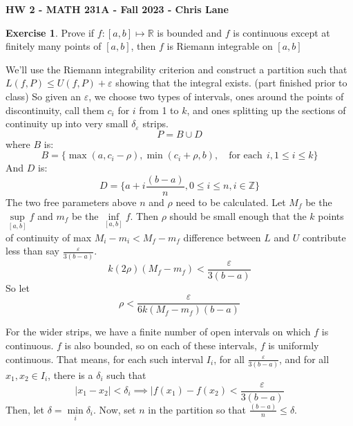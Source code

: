 \documentclass[11pt,oneside]{article}
\numberwithin{equation}{section}
\theoremstyle{definition}
\newtheorem{exercise}{Exercise}
\def\RR{\mathbb{R}}
\def\ZZ{\mathbb{Z}}
\begin{document}
\textbf{HW 2 - MATH 231A - Fall 2023 - Chris Lane}
\begin{exercise}
  Prove if $f:[a, b] \mapsto \RR $ is bounded and $f$ is continuous
  except at finitely many points of $[a,b]$, then $f$ is Riemann integrable on $[a,b ]$
\end{exercise}
\begin{solution}
  We'll use the Riemann integrability criterion and construct a
  partition such that $L(f, P) \leq U(f, P) + \varepsilon$ showing that
  the integral exists.  (part finished prior to class) So given an $\varepsilon$, we
  choose two types of intervals, ones around the points of
  discontinuity, call them $c_i$ for $i$ from 1 to $k$, and ones
  splitting up the sections of continuity up into very
  small $\delta_{\varepsilon}$ strips.
  $$
  P = B \cup D
  $$
  where $B$ is:
  $$
  B = \{ \max(a, c_i - \rho), \min(c_i + \rho, b), \quad \text{for each} \ \  i, 1 \leq i \leq k \}
  $$
  And $D$ is:
  $$
  D = \{ a + i \frac{(b - a)}{n}, 0 \leq i \leq n, i \in \ZZ \}
  $$
  The two free parameters above $n$ and $\rho$ need to be calculated.  Let $M_f$ be the
  $ \sup \limits_{[a,b]} f$ and $m_f$ be the $ \inf \limits_{[a,b]} f$.  Then $\rho$ should be
    small enough that the $k$ points of continuity of max $M_i - m_i < M_f - m_f$ difference between
    $L$ and $U$ contribute less than say $\frac{\varepsilon}{3(b-a)}$.
    $$ k (2 \rho) (M_f - m_f) < \frac{\varepsilon}{3(b-a)} $$
    So let 
    $$
    \rho < {\frac{\varepsilon}{6k (M_f - m_f)(b-a)} }
    $$
    
    For the wider strips, we have a finite number of open intervals on which $f$ is continuous.  $f$ is also
    bounded, so on each of these intervals, $f$ is uniformly continuous.  That means, for each such interval $I_i$, for
    all $\frac{\varepsilon}{3(b-a)}$, and for all $x_1, x_2 \in I_i$, there is a $\delta_i$ such that
    $$
    | x_1 - x_2 | < \delta_i \implies | f(x_1) - f(x_2) < \frac{\varepsilon}{3(b-a)}
    $$
    Then, let $\delta = \min \limits_i \delta_i$.  Now, set $n$ in the partition so that $\frac{(b-a)}{n} \leq \delta$.


\end{solution}
\end{document}
